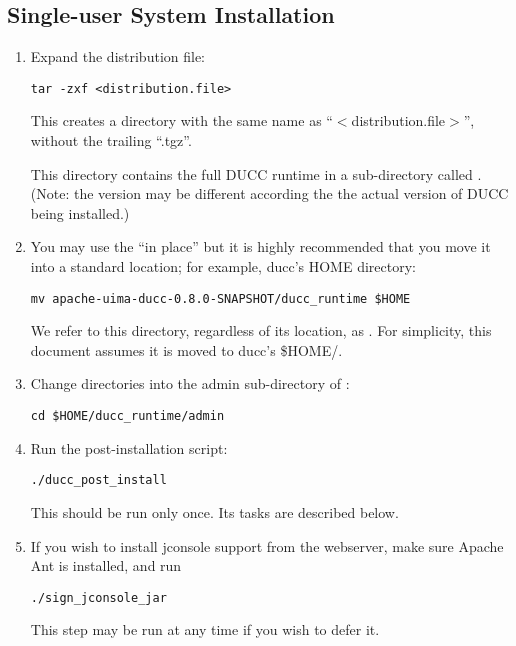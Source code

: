 \subsection{Single-user System Installation}
\label{subsec:install.single-user}
    \begin{enumerate}
      \item Expand the distribution file:
\begin{verbatim}
tar -zxf <distribution.file>
\end{verbatim}

        This creates a directory with the same name as ``$<$distribution.file$>$'', without the trailing ``.tgz''.
  
        This directory contains the full DUCC runtime in a sub-directory called \duccruntime.  (Note:
        the version may be different according the the actual version of DUCC being installed.)

      \item You may use the \duccruntime ``in place'' but it is highly recommended that you move it
        into a standard location; for example, ducc's HOME directory:
\begin{verbatim}
mv apache-uima-ducc-0.8.0-SNAPSHOT/ducc_runtime $HOME
\end{verbatim}

        We refer to this directory, regardless of its location, as \duccruntime. For simplicity,
        this document assumes it is moved to ducc's \$HOME/\duccruntime.

      \item Change directories into the admin sub-directory of  \duccruntime: 
\begin{verbatim}
cd $HOME/ducc_runtime/admin
\end{verbatim}

        \item Run the post-installation script: 
\begin{verbatim}
./ducc_post_install
\end{verbatim}
          This should be run only once. Its tasks are described below.

        \item If you wish to install jconsole support from the webserver, make sure Apache Ant
          is installed, and run
\begin{verbatim}
./sign_jconsole_jar
\end{verbatim}
          This step may be run at any time if you wish to defer it.

   \end{enumerate}

